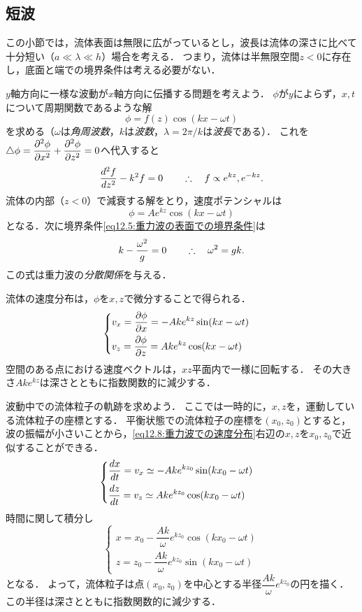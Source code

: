 \subsection*{短波}
この小節では，流体表面は無限に広がっているとし，波長は流体の深さに比べて十分短い（$a \ll \lambda \ll h$）場合を考える．
つまり，流体は半無限空間$z<0$に存在し，底面と端での境界条件は考える必要がない．


$y$軸方向に一様な波動が$x$軸方向に伝播する問題を考えよう．
$\phi$が$y$によらず，$x,t$について周期関数であるような解
\[
    \phi = f(z) \cos(kx-\omega t)
\]
を求める（$\omega$は\emph{角周波数}，$k$は\emph{波数}，$\lambda=2\pi/k$は\emph{波長}である）．
これを$\Laplacian\phi = \dpdv[2]{\phi}{x} +  \dpdv[2]{\phi}{z} = 0$へ代入すると
\[
    \dv[2]{f}{z} - k^2f = 0
    \qquad\therefore\quad f \propto e^{kz}, e^{-kz} .
\]
流体の内部（$z<0$）で減衰する解をとり，速度ポテンシャルは
\begin{equation}
    \phi = A e^{kz} \cos(kx-\omega t)
\end{equation}
となる．次に境界条件\eqref{eq12.5:重力波の表面での境界条件}は
\begin{equation}
    k - \frac{\omega^2}{g}  = 0 
    \qquad\therefore\quad \omega^2  = gk .
\end{equation}
この式は重力波の\emph{分散関係}を与える．

流体の速度分布は，$\phi$を$x,z$で微分することで得られる．
\begin{equation}\label{eq12.8:重力波での速度分布}
    \begin{cases}
        v_x = \dpdv{\phi}{x} = -Ak e^{kz} \sin(kx-\omega t) \\[7pt]
        v_z = \dpdv{\phi}{z} = Ak e^{kz} \cos(kx-\omega t) 
    \end{cases}
\end{equation}
空間のある点における速度ベクトルは，$xz$平面内で一様に回転する．
その大きさ$Ake^{kz}$は深さとともに指数関数的に減少する．


波動中での流体粒子の軌跡を求めよう．
ここでは一時的に，$x,z$を，運動している流体粒子の座標とする．
平衡状態での流体粒子の座標を$(x_0,z_0)$とすると，波の振幅が小さいことから，\eqref{eq12.8:重力波での速度分布}右辺の$x,z$を$x_0,z_0$で近似することができる．
\[
    \begin{cases}
        \ddv{x}{t} = v_x \simeq -Ak e^{kz_0} \sin(kx_0-\omega t) \\[7pt]
        \ddv{z}{t} = v_z \simeq Ak e^{kz_0} \cos(kx_0-\omega t) 
    \end{cases}
\]
時間に関して積分し
\begin{equation}
    \begin{cases}
        x = x_0 - \dfrac{Ak}{\omega} e^{kz_0} \cos(kx_0-\omega t) \\[7pt]
        z = z_0 - \dfrac{Ak}{\omega} e^{kz_0} \sin(kx_0-\omega t) 
    \end{cases}
\end{equation}
となる．
よって，流体粒子は点$(x_0,z_0)$を中心とする半径$\dfrac{Ak}{\omega} e^{kz_0}$の円を描く．
この半径は深さとともに指数関数的に減少する．

